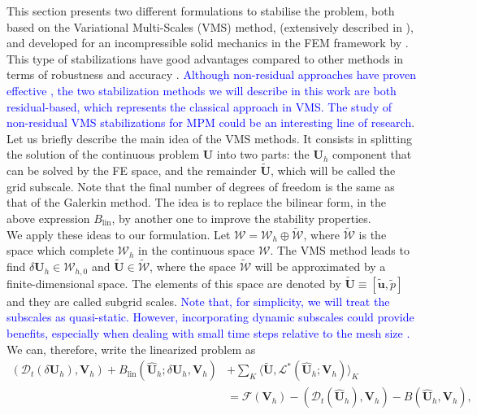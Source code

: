 \documentclass[11pt,english]{article}
\newcommand{\LM}[1]{\textcolor{blue}{#1}}
\def\disp{\boldsymbol{u}}
\def\SpaceTotal{\boldsymbol{\mathcal{W}}}
\def\TestFunctions{\boldsymbol{V}}
\def\UnkVariables{\boldsymbol{U}}
\def\DerB{B_{\text{lin}}}
\begin{document}
     This section presents two different formulations to stabilise the problem, both based on the Variational Multi-Scales (VMS) method, (extensively described in \cite{hughes1998variational}), and developed for an incompressible solid mechanics in the FEM framework by \cite{castanar2020stabilized}. This type of stabilizations have good advantages compared to other methods in terms of robustness and accuracy \cite{codina2008analysis,cervera2003mixed}.
     \LM{Although non-residual approaches have proven effective \cite{castillo2014,moreno2019logarithmic}, the two stabilization methods we will describe in this work are both residual-based, which represents the classical approach in VMS. The study of non-residual VMS stabilizations for MPM could be an interesting line of research}.\\
     Let us briefly describe the main idea of the VMS methods. It consists in splitting the solution of the continuous problem $\boldsymbol{U}$ into two parts: the $\boldsymbol{U}_h$ component that can be solved by the FE space, and the remainder $\tilde{\boldsymbol{U}}$, which will be called the grid subscale. Note that the final number of degrees of freedom is the same as that of the Galerkin method.  The idea is to replace the bilinear form, in the above expression $\DerB$, by another one to improve the stability properties.\\ 
 	We apply these ideas to our formulation. Let $\SpaceTotal=\SpaceTotal_h \oplus \tilde{\SpaceTotal}$, where $\tilde{\SpaceTotal}$ is the space which complete $\SpaceTotal_h$ in the continuous space $\SpaceTotal$.
    The VMS method leads to find $\delta \UnkVariables_h \in \SpaceTotal_{h,0}$ and $\tilde{\UnkVariables} \in \tilde{\SpaceTotal}$, where the space $\tilde{\SpaceTotal}$ will be approximated by a finite-dimensional space. The elements of this space are denoted by $\tilde{\UnkVariables}\equiv\left[\tilde{\disp},\tilde{p} \right]$ and they are called subgrid scales.  \LM{Note that, for simplicity, we will treat the subscales as quasi-static. However, incorporating dynamic subscales could provide benefits, especially when dealing with small time steps relative to the mesh size \cite{castillo2019dynamic,moreno2020solution}.} We can, therefore, write the linearized problem as
    \begin{align}
        \left(\mathcal{D}_t\left( \delta \UnkVariables_h \right),\TestFunctions_h \right) + \DerB (\hat{\UnkVariables}_h;\delta \UnkVariables_h,\TestFunctions_h) &+ \sum_K \langle \tilde{\UnkVariables}, \mathcal{L}^*(\hat{\UnkVariables}_h;\boldsymbol{V}_h)\rangle_K \\ \nonumber
        &= \mathcal{F}\left(\TestFunctions_h\right) -(\mathcal{D}_t(\hat{\UnkVariables}_h),\TestFunctions_h) -B(\hat{\UnkVariables}_h,\TestFunctions_h),  \label{eq:stabilized_in_compact_form}
    \end{align}
\end{document}
